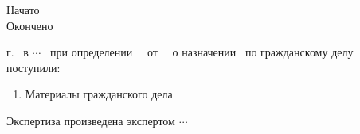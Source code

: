 
\begin{flushright}
	\noindent\parbox[l][10 mm]{5cm}
	{\def\hrf#1{\hbox to#1{\hrulefill}}
		\noindent Начато\hfill            \datastart\\%
		Окончено\hfill                \dataend
	}
\end{flushright}
\relax

\datastart г. ~в {\small $\cdots$} \,  при определении  \, \sud  \,  от \, \dataopr \, о назначении \opr \, по гражданскому делу \delonum \, поступили:

\begin{enumerate}\item  Материалы гражданского дела \delonum \\[-2mm]
\end{enumerate}Экспертиза произведена экспертом  $\cdots$